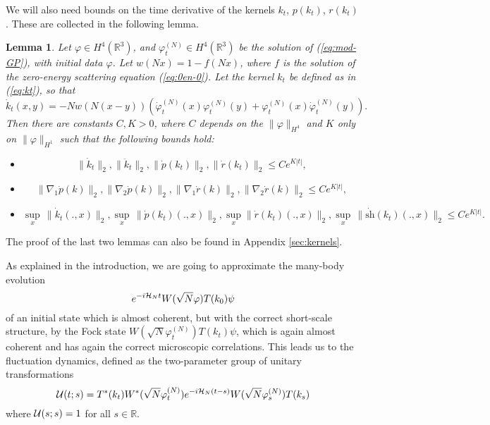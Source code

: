 \documentclass[11pt,a4paper]{article}
\newtheorem{lemma}[thm]{Lemma}
\newcommand{\cU}{{\cal U}}
\newcommand{\bR}{{\mathbb R}}
\newcommand{\cH}{{\cal H}}
\newcommand{\R}{\mathbb{R}}
\newcommand{\norm}[1]{\lVert#1\rVert}	%
\newcommand{\ph}{\varphi_t^{(N)}}	%
\begin{document}
We will also need bounds on the time derivative of the kernels $k_t$, $p(k_t)$, $r(k_t)$. These are collected in the following lemma.
\begin{lemma}\label{lm:dotk} 
Let $\varphi \in H^4(\R^3)$, and $\ph \in H^4 (\bR^3)$ be the solution of (\ref{eq:mod-GP}), with initial data $\varphi$. Let $w(Nx) = 1 - f(Nx)$, where $f$ is the solution of the zero-energy scattering equation (\ref{eq:0en-0}). Let the kernel $k_t$ be defined as in (\ref{eq:kt}), so that
\begin{equation}\label{eq:dtk} \dot{k}_t (x,y) = - N w (N (x-y)) \left( \dot{\varphi}_t^{(N)} (x) \varphi_t^{(N)} (y) + \varphi_t^{(N)} (x) \dot{\varphi}_t^{(N)} (y) \right). \end{equation}
Then there are constants $C,K >0$, where $C$ depends on the $\| \varphi \|_{H^4}$ and $K$ only on $\| \varphi \|_{H^1}$ such that the following bounds hold: 
\begin{itemize}
\item[(i)]   
 \[  \| \dot{k}_t \|_2 ,  \| \ddot k_t \|_2 , \| \dot{p} (k_t) \|_2 , \| \dot{r} (k_t) \|_2  \leq C e^{K|t|}, \]
\item[(ii)] 
\[ \| \nabla_1 \dot p (k) \|_2 ,  \| \nabla_2 \dot p (k) \|_2 , \| \nabla_1 \dot r (k) \|_2,  \| \nabla_2 \dot r (k) \|_2  \leq C  e^{K|t|}, \]
\item[(iii)] 
\[
\sup_x \, \norm{\dot k_t (., x)}_{2} ,  \sup_x \, \norm{\dot p (k_t) (., x)}_{2}, \sup_x \norm{\dot r (k_t) (., x)}_{2}, \sup_x \, \| \dot{\text{sh}} (k_t) (., x) \|_2  \leq C e^{K|t|}.
\] 
 \end{itemize}
 \end{lemma}
The proof of the last two lemmas can also be found in Appendix \ref{sec:kernels}. 

\bigskip

As explained in the introduction, we are going to approximate the many-body evolution
\[ e^{-i \cH_N t} W(\sqrt{N} \varphi ) T(k_0) \psi \]
of an initial state which is almost coherent, but with the correct short-scale structure, by the Fock state $W(\sqrt{N} \varphi_t^{(N)}) T(k_t) \psi$, which is again almost coherent and has again the correct microscopic correlations. This leads us to the fluctuation dynamics, defined as the two-parameter group of unitary transformations 
\begin{equation}\label{eq:cU} \cU (t;s) = T^* (k_t) W^* (\sqrt{N} \varphi_t^{(N)}) e^{-i\cH_N (t-s)} W(\sqrt{N} \varphi_s^{(N)}) T(k_s) \end{equation}
where $\cU (s;s) = 1$ for all $s \in \bR$. 
\end{document}
